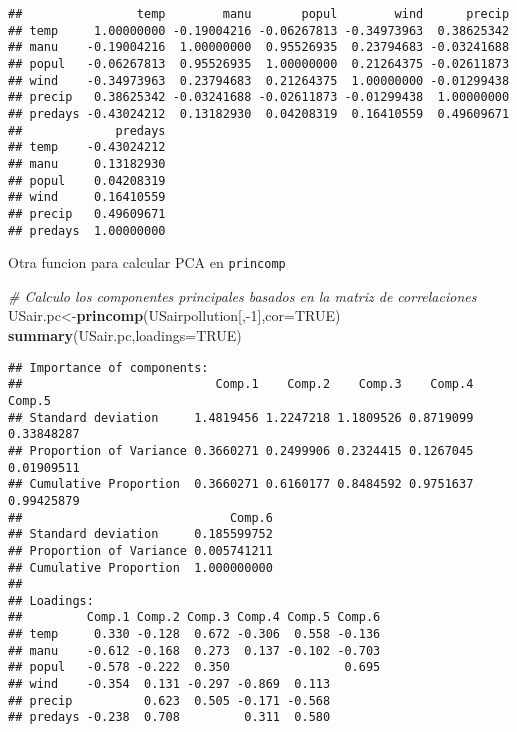 \documentclass[]{article}
\newenvironment{Shaded}{\begin{snugshade}}{\end{snugshade}}
\newcommand{\KeywordTok}[1]{\textcolor[rgb]{0.13,0.29,0.53}{\textbf{{#1}}}}
\newcommand{\DataTypeTok}[1]{\textcolor[rgb]{0.13,0.29,0.53}{{#1}}}
\newcommand{\DecValTok}[1]{\textcolor[rgb]{0.00,0.00,0.81}{{#1}}}
\newcommand{\CommentTok}[1]{\textcolor[rgb]{0.56,0.35,0.01}{\textit{{#1}}}}
\newcommand{\OtherTok}[1]{\textcolor[rgb]{0.56,0.35,0.01}{{#1}}}
\newcommand{\NormalTok}[1]{{#1}}
\numberwithin{equation}{section}
\begin{document}
\begin{verbatim}
##                temp        manu       popul        wind      precip
## temp     1.00000000 -0.19004216 -0.06267813 -0.34973963  0.38625342
## manu    -0.19004216  1.00000000  0.95526935  0.23794683 -0.03241688
## popul   -0.06267813  0.95526935  1.00000000  0.21264375 -0.02611873
## wind    -0.34973963  0.23794683  0.21264375  1.00000000 -0.01299438
## precip   0.38625342 -0.03241688 -0.02611873 -0.01299438  1.00000000
## predays -0.43024212  0.13182930  0.04208319  0.16410559  0.49609671
##             predays
## temp    -0.43024212
## manu     0.13182930
## popul    0.04208319
## wind     0.16410559
## precip   0.49609671
## predays  1.00000000
\end{verbatim}

Otra funcion para calcular PCA en \texttt{princomp}

\begin{Shaded}
\begin{Highlighting}[]
\CommentTok{# Calculo los componentes principales basados en la matriz de correlaciones }
\NormalTok{USair.pc<-}\KeywordTok{princomp}\NormalTok{(USairpollution[,-}\DecValTok{1}\NormalTok{],}\DataTypeTok{cor=}\OtherTok{TRUE}\NormalTok{) }
\KeywordTok{summary}\NormalTok{(USair.pc,}\DataTypeTok{loadings=}\OtherTok{TRUE}\NormalTok{)}
\end{Highlighting}
\end{Shaded}

\begin{verbatim}
## Importance of components:
##                           Comp.1    Comp.2    Comp.3    Comp.4     Comp.5
## Standard deviation     1.4819456 1.2247218 1.1809526 0.8719099 0.33848287
## Proportion of Variance 0.3660271 0.2499906 0.2324415 0.1267045 0.01909511
## Cumulative Proportion  0.3660271 0.6160177 0.8484592 0.9751637 0.99425879
##                             Comp.6
## Standard deviation     0.185599752
## Proportion of Variance 0.005741211
## Cumulative Proportion  1.000000000
## 
## Loadings:
##         Comp.1 Comp.2 Comp.3 Comp.4 Comp.5 Comp.6
## temp     0.330 -0.128  0.672 -0.306  0.558 -0.136
## manu    -0.612 -0.168  0.273  0.137 -0.102 -0.703
## popul   -0.578 -0.222  0.350                0.695
## wind    -0.354  0.131 -0.297 -0.869  0.113       
## precip          0.623  0.505 -0.171 -0.568       
## predays -0.238  0.708         0.311  0.580
\end{verbatim}

\begin{Shaded}
\end{Shaded}
\end{document}
